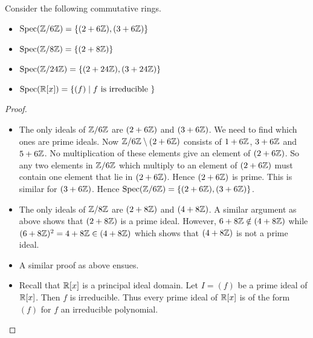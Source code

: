 \documentclass[a4paper]{article}
\begin{document}
\begin{eg}{}{} Consider the following commutative rings. 
\begin{itemize}
\item $\text{Spec}(\mathbb{Z}/6\mathbb{Z})=\{(2+6\mathbb{Z}),(3+6\mathbb{Z})\}$
\item $\text{Spec}(\mathbb{Z}/8\mathbb{Z})=\{(2+8\mathbb{Z})\}$
\item $\text{Spec}(\mathbb{Z}/24\mathbb{Z})=\{(2+24\mathbb{Z}),(3+24\mathbb{Z})\}$
\item $\text{Spec}(\mathbb{R}[x])=\{(f)\;|\;f\text{ is irreducible }\}$
\end{itemize} \tcbline
\begin{proof}~\\
\begin{itemize}
\item The only ideals of $\mathbb{Z}/6\mathbb{Z}$ are $(2+6\mathbb{Z})$ and $(3+6\mathbb{Z})$. We need to find which ones are prime ideals. Now $\mathbb{Z}/6\mathbb{Z}\setminus(2+6\mathbb{Z})$ consists of $1+6\mathbb{Z}$, $3+6\mathbb{Z}$ and $5+6\mathbb{Z}$. No multiplication of these elements give an element of $(2+6\mathbb{Z})$. So any two elements in $\mathbb{Z}/6\mathbb{Z}$ which multiply to an element of $(2+6\mathbb{Z})$ must contain one element that lie in $(2+6\mathbb{Z})$. Hence $(2+6\mathbb{Z})$ is prime. This is similar for $(3+6\mathbb{Z})$. Hence $\text{Spec}(\mathbb{Z}/6\mathbb{Z})=\{(2+6\mathbb{Z}),(3+6\mathbb{Z})\}$. 
\item The only ideals of $\mathbb{Z}/8\mathbb{Z}$ are $(2+8\mathbb{Z})$ and $(4+8\mathbb{Z})$. A similar argument as above shows that $(2+8\mathbb{Z})$ is a prime ideal. However, $6+8\mathbb{Z}\notin(4+8\mathbb{Z})$ while $(6+8\mathbb{Z})^2=4+8\mathbb{Z}\in(4+8\mathbb{Z})$ which shows that $(4+8\mathbb{Z})$ is not a prime ideal. 
\item A similar proof as above ensues. 
\item Recall that $\mathbb{R}[x]$ is a principal ideal domain. Let $I=(f)$ be a prime ideal of $\mathbb{R}[x]$. Then $f$ is irreducible. Thus every prime ideal of $\mathbb{R}[x]$ is of the form $(f)$ for $f$ an irreducible polynomial. 
\end{itemize}
\end{proof}
\end{eg}
\end{document}

